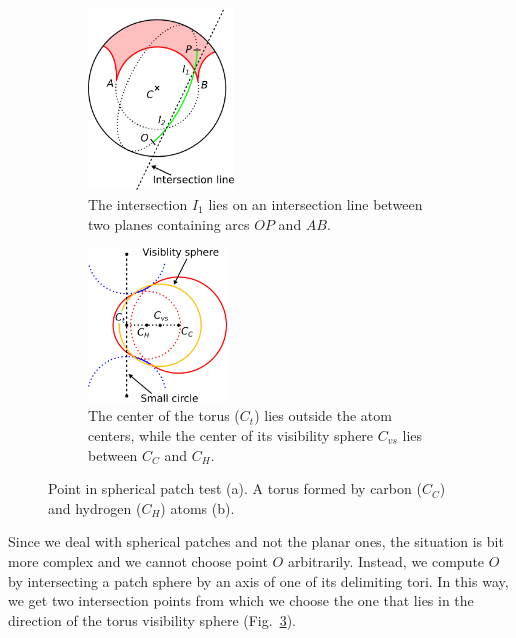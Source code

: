 \begin{figure}[htp]
  \centering
  \begin{subfigure}[c]{0.52\columnwidth}
    \centering
    \includegraphics[height=1.9in]{image/patch.png}
    \caption{%
		The intersection $I_1$ lies on an intersection line between two planes containing arcs $OP$ and $AB$.}
		\label{fig:spherical-patch}
  \end{subfigure}%
  \quad
  \begin{subfigure}[c]{0.44\columnwidth}
    \centering
    \includegraphics[height=1.6in]{image/outer.png}
    \caption{%
		The center of the torus ($C_{t}$) lies outside the atom centers, while the center of its visibility sphere $C_{vs}$ lies between $C_C$ and $C_H$.}
		\label{fig:outer-point}
  \end{subfigure}
\caption{Point in spherical patch test (a). A torus formed by carbon ($C_C$) and hydrogen ($C_H$) atoms (b).}
\end{figure}

Since we deal with spherical patches and not the planar ones, the situation is bit more complex and we cannot choose point $O$ arbitrarily. 
Instead, we compute $O$ by intersecting a patch sphere by an axis of one of its delimiting tori.
In this way, we get two intersection points from which we choose the one that lies in the direction of the torus visibility sphere (Fig.~\ref{fig:outer-point}).


